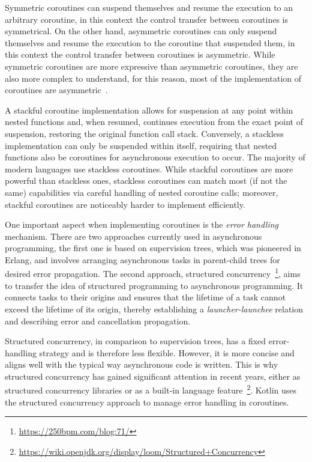 Symmetric coroutines can suspend themselves and resume the execution to an arbitrary coroutine, in this context the control transfer between
coroutines is symmetrical. On the other hand, asymmetric coroutines can only suspend themselves and resume the execution to the coroutine that
suspended them, in this context the control transfer between coroutines is asymmetric. While symmetric coroutines are more expressive than asymmetric
coroutines, they are also more complex to understand, for this reason, most of the implementation of coroutines are
asymmetric~\cite{elizarov2021kotlin}.

A stackful coroutine implementation allows for suspension at any point within nested functions and, when resumed, continues execution from the exact
point of suspension, restoring the original function call stack. Conversely, a stackless implementation can only be suspended within itself,
requiring that nested functions also be coroutines for asynchronous execution to occur. The majority of modern languages use stackless coroutines.
While stackful coroutines are more powerful than stackless ones, stackless coroutines can match most (if not the same) capabilities
via careful handling of nested coroutine calls; moreover, stackful coroutines are noticeably harder to implement efficiently.

One important aspect when implementing coroutines is the \emph{error handling} mechanism.
There are two approaches currently used in asynchronous programming, the first one is based on supervision trees, which was pioneered in Erlang,
and involves arranging asynchronous tasks in parent-child trees for desired error propagation. The second approach, structured
concurrency~\footnote{\url{https://250bpm.com/blog:71/}}, aims to transfer the idea of structured programming to asynchronous programming. It connects tasks to
their origins and ensures that the lifetime of a task cannot exceed the lifetime of its origin, thereby establishing a \emph{launcher-launchee}
relation and describing error and cancellation propagation.

Structured concurrency, in comparison to supervision trees, has a fixed error-handling strategy and is therefore less flexible. However, it is more
concise and aligns well with the typical way asynchronous code is written. This is why structured concurrency has gained significant attention in
recent years, either as structured concurrency libraries or as a built-in language feature~\footnote{\url{https://wiki.openjdk.org/display/loom/Structured+Concurrency}}. Kotlin uses the structured
concurrency approach to manage error handling in coroutines.

